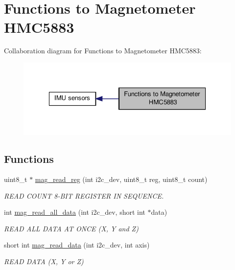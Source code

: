 \hypertarget{group__mag}{\section{Functions to Magnetometer H\-M\-C5883}
\label{group__mag}
}
Collaboration diagram for Functions to Magnetometer H\-M\-C5883\-:\nopagebreak
\begin{figure}[H]
\begin{center}
\leavevmode
\includegraphics[width=326pt]{group__mag}
\end{center}
\end{figure}
\subsection*{Functions}
\begin{DoxyCompactItemize}
\item 
uint8\-\_\-t $\ast$ \hyperlink{group__mag_ga6830eaeae2298320e1e8c902e4edd709}{mag\-\_\-read\-\_\-reg} (int i2c\-\_\-dev, uint8\-\_\-t reg, uint8\-\_\-t count)
\begin{DoxyCompactList}\small\item\em R\-E\-A\-D C\-O\-U\-N\-T 8-\/\-B\-I\-T R\-E\-G\-I\-S\-T\-E\-R I\-N S\-E\-Q\-U\-E\-N\-C\-E. \end{DoxyCompactList}\item 
int \hyperlink{group__mag_gab42ae0d0a2a6f37cf36d856c072b7f34}{mag\-\_\-read\-\_\-all\-\_\-data} (int i2c\-\_\-dev, short int $\ast$data)
\begin{DoxyCompactList}\small\item\em R\-E\-A\-D A\-L\-L D\-A\-T\-A A\-T O\-N\-C\-E (X, Y and Z) \end{DoxyCompactList}\item 
short int \hyperlink{group__mag_ga542a31ccd07cd2c3e8e2b68cdb6d219e}{mag\-\_\-read\-\_\-data} (int i2c\-\_\-dev, int axis)
\begin{DoxyCompactList}\small\item\em R\-E\-A\-D D\-A\-T\-A (X, Y or Z) \end{DoxyCompactList}\end{DoxyCompactItemize}


